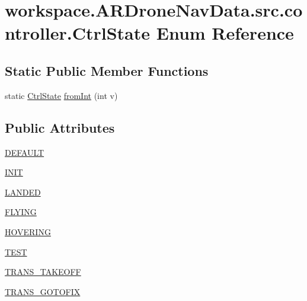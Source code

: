 \hypertarget{enumworkspace_1_1_a_r_drone_nav_data_1_1src_1_1controller_1_1_ctrl_state}{}\section{workspace.\+A\+R\+Drone\+Nav\+Data.\+src.\+controller.\+Ctrl\+State Enum Reference}
\label{enumworkspace_1_1_a_r_drone_nav_data_1_1src_1_1controller_1_1_ctrl_state}
\subsection*{Static Public Member Functions}
\begin{DoxyCompactItemize}
\item 
static \hyperlink{enumworkspace_1_1_a_r_drone_nav_data_1_1src_1_1controller_1_1_ctrl_state}{Ctrl\+State} \hyperlink{enumworkspace_1_1_a_r_drone_nav_data_1_1src_1_1controller_1_1_ctrl_state_a12e972814c520c7a3da99809b3c7973b}{from\+Int} (int v)
\end{DoxyCompactItemize}
\subsection*{Public Attributes}
\begin{DoxyCompactItemize}
\item 
\hyperlink{enumworkspace_1_1_a_r_drone_nav_data_1_1src_1_1controller_1_1_ctrl_state_a11f5358850776e864fd2b9b41d16bd01}{D\+E\+F\+A\+U\+L\+T}
\item 
\hyperlink{enumworkspace_1_1_a_r_drone_nav_data_1_1src_1_1controller_1_1_ctrl_state_ac0c37bcebc4cac0ffcf936038c66e192}{I\+N\+I\+T}
\item 
\hyperlink{enumworkspace_1_1_a_r_drone_nav_data_1_1src_1_1controller_1_1_ctrl_state_afd1cd7a74bb1b365d575b7b113cdd345}{L\+A\+N\+D\+E\+D}
\item 
\hyperlink{enumworkspace_1_1_a_r_drone_nav_data_1_1src_1_1controller_1_1_ctrl_state_a1abd0793f37fa1dcb5910b981f1ba1c0}{F\+L\+Y\+I\+N\+G}
\item 
\hyperlink{enumworkspace_1_1_a_r_drone_nav_data_1_1src_1_1controller_1_1_ctrl_state_aa506078421e4eee0e30aa759ea7b1f30}{H\+O\+V\+E\+R\+I\+N\+G}
\item 
\hyperlink{enumworkspace_1_1_a_r_drone_nav_data_1_1src_1_1controller_1_1_ctrl_state_a791ab056664ab06886d2aee5e47fda32}{T\+E\+S\+T}
\item 
\hyperlink{enumworkspace_1_1_a_r_drone_nav_data_1_1src_1_1controller_1_1_ctrl_state_ae3c0f7718462c6ffa0d4dbf8f9de6764}{T\+R\+A\+N\+S\+\_\+\+T\+A\+K\+E\+O\+F\+F}
\item 
\hyperlink{enumworkspace_1_1_a_r_drone_nav_data_1_1src_1_1controller_1_1_ctrl_state_ae3b43c075164218665e83ea9a5665377}{T\+R\+A\+N\+S\+\_\+\+G\+O\+T\+O\+F\+I\+X}
\end{DoxyCompactItemize}


